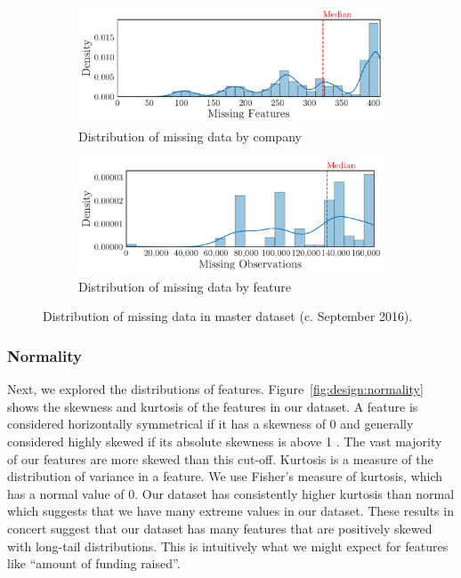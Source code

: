 \documentclass[../thesis/thesis.tex]{subfiles}
\begin{document}
\begin{figure}[!htb]
    \centering
    \begin{subfigure}{\textwidth}
        \includegraphics[width=\textwidth]{../figures/design/sparsity_features}
        \caption[Sparsity by company]{Distribution of missing data by company}
        \label{fig:design:sparsity:features}
    \end{subfigure}
    \begin{subfigure}{\textwidth}
        \includegraphics[width=\textwidth]{../figures/design/sparsity_observations}
        \caption[Sparsity by feature]{Distribution of missing data by feature}
        \label{fig:design:sparsity:observations}
    \end{subfigure}
    \caption[Distribution of missing data]{Distribution of missing data in master dataset (c. September 2016).}
    \label{fig:design:sparsity}
\end{figure}

\subsubsection{Normality}

Next, we explored the distributions of features. Figure~\ref{fig:design:normality} shows the skewness and kurtosis of the features in our dataset. A feature is considered horizontally symmetrical if it has a skewness of 0 and generally considered highly skewed if its absolute skewness is above 1 \cite{bulmer1979}. The vast majority of our features are more skewed than this cut-off. Kurtosis is a measure of the distribution of variance in a feature. We use Fisher's measure of kurtosis, which has a normal value of 0. Our dataset has consistently higher kurtosis than normal which suggests that we have many extreme values in our dataset. These results in concert suggest that our dataset has many features that are positively skewed with long-tail distributions. This is intuitively what we might expect for features like ``amount of funding raised''.
\end{document}
